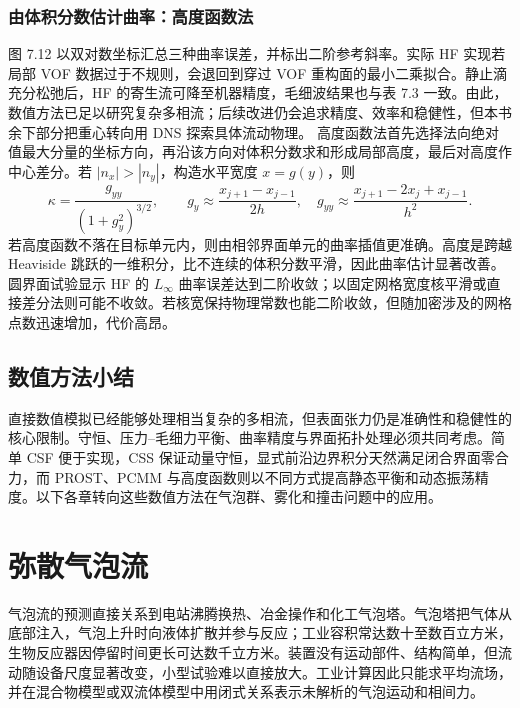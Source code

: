 \documentclass[11pt,a4paper,openany,fontset=none]{ctexbook}
\begin{document}
\subsection{由体积分数估计曲率：高度函数法}

图 7.12 以双对数坐标汇总三种曲率误差，并标出二阶参考斜率。实际 HF 实现若局部 VOF 数据过于不规则，会退回到穿过 VOF 重构面的最小二乘拟合。静止滴充分松弛后，HF 的寄生流可降至机器精度，毛细波结果也与表 7.3 一致。由此，数值方法已足以研究复杂多相流；后续改进仍会追求精度、效率和稳健性，但本书余下部分把重心转向用 DNS 探索具体流动物理。
高度函数法首先选择法向绝对值最大分量的坐标方向，再沿该方向对体积分数求和形成局部高度，最后对高度作中心差分。若 $|n_x|>|n_y|$，构造水平宽度 $x=g(y)$，则
\begin{equation}
 \kappa=\frac{g_{yy}}{(1+g_y^2)^{3/2}},
 \qquad
 g_y\approx\frac{x_{j+1}-x_{j-1}}{2h},
 \quad
 g_{yy}\approx\frac{x_{j+1}-2x_j+x_{j-1}}{h^2}.
 \tag{7.76}
\end{equation}
若高度函数不落在目标单元内，则由相邻界面单元的曲率插值更准确。高度是跨越 Heaviside 跳跃的一维积分，比不连续的体积分数平滑，因此曲率估计显著改善。圆界面试验显示 HF 的 $L_\infty$ 曲率误差达到二阶收敛；以固定网格宽度核平滑或直接差分法则可能不收敛。若核宽保持物理常数也能二阶收敛，但随加密涉及的网格点数迅速增加，代价高昂。

\section{数值方法小结}

直接数值模拟已经能够处理相当复杂的多相流，但表面张力仍是准确性和稳健性的核心限制。守恒、压力--毛细力平衡、曲率精度与界面拓扑处理必须共同考虑。简单 CSF 便于实现，CSS 保证动量守恒，显式前沿边界积分天然满足闭合界面零合力，而 PROST、PCMM 与高度函数则以不同方式提高静态平衡和动态振荡精度。以下各章转向这些数值方法在气泡群、雾化和撞击问题中的应用。

\chapter{弥散气泡流}

气泡流的预测直接关系到电站沸腾换热、冶金操作和化工气泡塔。气泡塔把气体从底部注入，气泡上升时向液体扩散并参与反应；工业容积常达数十至数百立方米，生物反应器因停留时间更长可达数千立方米。装置没有运动部件、结构简单，但流动随设备尺度显著改变，小型试验难以直接放大。工业计算因此只能求平均流场，并在混合物模型或双流体模型中用闭式关系表示未解析的气泡运动和相间力。
\end{document}
